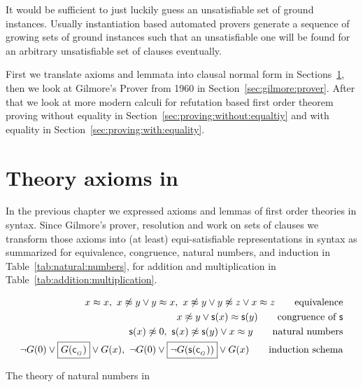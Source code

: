 
It would be sufficient to just luckily guess an unsatisfiable set of ground instances.
Usually instantiation based automated provers generate
a sequence of growing sets of ground instances
such that an unsatisfiable one will be found
for an arbitrary unsatisfiable set of clauses
eventually.

First we translate axioms and lemmata into clausal normal form in Sections~\ref{sec:clausal:normal:form},
then we look at Gilmore's Prover from 1960 in Section~\ref{sec:gilmore:prover}.
After that we look at more modern calculi for refutation based first order theorem proving
without equality in Section~\ref{sec:proving:without:equaltiy} and with equality in Section~\ref{sec:proving:with:equality}.


%
%
%

%
%

\section{Theory axioms in \CNF}\label{sec:clausal:normal:form}

In the previous chapter we expressed axioms and lemmas of first order theories in \FOF{} syntax.
Since Gilmore's prover, resolution and \InstGen{} work on sets of clauses we transform
those axioms into (at least) equi-satisfiable representations in \CNF{} syntax
as summarized for equivalence, congruence, natural numbers, and induction in Table~\ref{tab:natural:numbers},
for addition and multiplication in Table~\ref{tab:addition:multiplication}.

\begin{table}[hbt]
	\begin{align*}
	x\mEQ x,\
	x\mNE y\lor y\mEQ x,\
	x\mNE y\lor y\mNE z\lor x\mEQ z
	\tag*{equivalence}
	\\
	x\mNE y\lor \msucc(x)\mEQ\msucc(y)
	\tag*{congruence of \( \msucc \)}
	\\
	\msucc(x) \mNE 0,\
	\msucc(x) \mNE \msucc(y) \lor x \mEQ y
	\tag*{natural numbers}
	\\
	\lnot G(0) \lor \boxed{G(\mc_{_G})} \lor G(x),\
	\lnot G(0) \lor \boxed{\lnot G(\msucc(\mc_{_G}))} \lor G(x)
	\tag*{induction schema}
	\end{align*}
	\caption{The theory of natural numbers in \CNF}\label{tab:natural:numbers}
\end{table}

